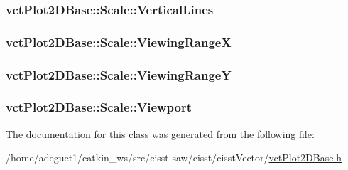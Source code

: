 \hypertarget{classvct_plot2_d_base_1_1_scale_abf66269635d563e367c3afeba8334053}{
\subsubsection[{Vertical\-Lines}]{ vct\-Plot2\-D\-Base\-::\-Scale\-::\-Vertical\-Lines}}\label{classvct_plot2_d_base_1_1_scale_abf66269635d563e367c3afeba8334053}
\hypertarget{classvct_plot2_d_base_1_1_scale_a9d017bf27e0f5cef7a916acb0c5b9638}{
\subsubsection[{Viewing\-Range\-X}]{ vct\-Plot2\-D\-Base\-::\-Scale\-::\-Viewing\-Range\-X\hspace{0.3cm}{\ttfamily [protected]}}}\label{classvct_plot2_d_base_1_1_scale_a9d017bf27e0f5cef7a916acb0c5b9638}
\hypertarget{classvct_plot2_d_base_1_1_scale_accd0d96ac002b90cabd39bcd3bcc4ee4}{
\subsubsection[{Viewing\-Range\-Y}]{ vct\-Plot2\-D\-Base\-::\-Scale\-::\-Viewing\-Range\-Y\hspace{0.3cm}{\ttfamily [protected]}}}\label{classvct_plot2_d_base_1_1_scale_accd0d96ac002b90cabd39bcd3bcc4ee4}
\hypertarget{classvct_plot2_d_base_1_1_scale_a3ad0dc662565feaa26046ab15b40efb1}{
\subsubsection[{Viewport}]{ vct\-Plot2\-D\-Base\-::\-Scale\-::\-Viewport\hspace{0.3cm}{\ttfamily [protected]}}}\label{classvct_plot2_d_base_1_1_scale_a3ad0dc662565feaa26046ab15b40efb1}


The documentation for this class was generated from the following file\-:\begin{DoxyCompactItemize}
\item 
/home/adeguet1/catkin\-\_\-ws/src/cisst-\/saw/cisst/cisst\-Vector/\hyperlink{vct_plot2_d_base_8h}{vct\-Plot2\-D\-Base.\-h}\end{DoxyCompactItemize}
